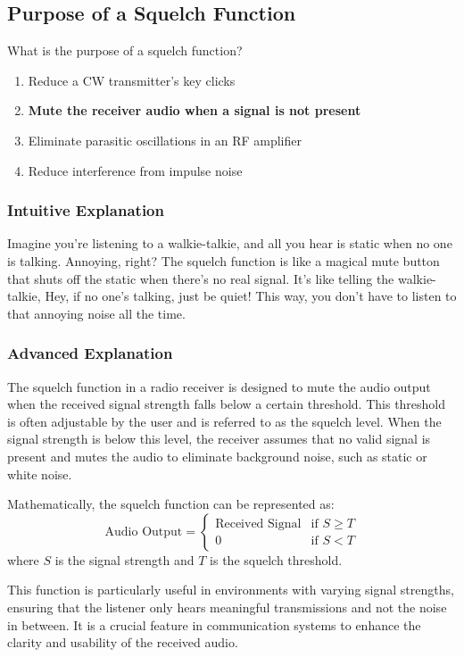 \subsection{Purpose of a Squelch Function}
\label{T2B13}

\begin{tcolorbox}[colback=gray!10!white,colframe=black!75!black,title=T2B13]
What is the purpose of a squelch function?
\begin{enumerate}[label=\Alph*)]
    \item Reduce a CW transmitter's key clicks
    \item \textbf{Mute the receiver audio when a signal is not present}
    \item Eliminate parasitic oscillations in an RF amplifier
    \item Reduce interference from impulse noise
\end{enumerate}
\end{tcolorbox}

\subsubsection{Intuitive Explanation}
Imagine you're listening to a walkie-talkie, and all you hear is static when no one is talking. Annoying, right? The squelch function is like a magical mute button that shuts off the static when there's no real signal. It’s like telling the walkie-talkie, Hey, if no one’s talking, just be quiet! This way, you don’t have to listen to that annoying noise all the time.

\subsubsection{Advanced Explanation}
The squelch function in a radio receiver is designed to mute the audio output when the received signal strength falls below a certain threshold. This threshold is often adjustable by the user and is referred to as the squelch level. When the signal strength is below this level, the receiver assumes that no valid signal is present and mutes the audio to eliminate background noise, such as static or white noise.

Mathematically, the squelch function can be represented as:
\[
\text{Audio Output} = 
\begin{cases}
\text{Received Signal} & \text{if } S \geq T \\
0 & \text{if } S < T
\end{cases}
\]
where \( S \) is the signal strength and \( T \) is the squelch threshold.

This function is particularly useful in environments with varying signal strengths, ensuring that the listener only hears meaningful transmissions and not the noise in between. It is a crucial feature in communication systems to enhance the clarity and usability of the received audio.

